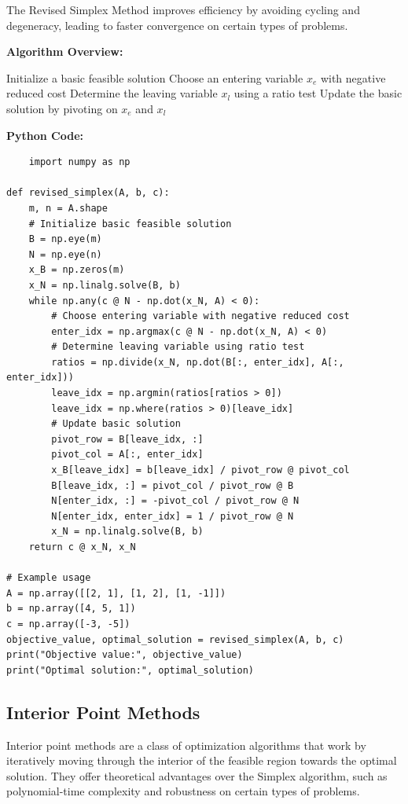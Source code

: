 \documentclass[12pt]{book} %
\begin{document}
The Revised Simplex Method improves efficiency by avoiding cycling and degeneracy, leading to faster convergence on certain types of problems.

\textbf{Algorithm Overview:}
\FloatBarrier
\begin{algorithm}[H]
\caption{Revised Simplex Method}
\begin{algorithmic}[1]
\State Initialize a basic feasible solution
\State Choose an entering variable \(x_e\) with negative reduced cost
\State Determine the leaving variable \(x_l\) using a ratio test
\State Update the basic solution by pivoting on \(x_e\) and \(x_l\)
\EndWhile
\end{algorithmic}
\end{algorithm}
\FloatBarrier
\textbf{Python Code:}
\FloatBarrier
\begin{lstlisting}
    import numpy as np

def revised_simplex(A, b, c):
    m, n = A.shape
    # Initialize basic feasible solution
    B = np.eye(m)
    N = np.eye(n)
    x_B = np.zeros(m)
    x_N = np.linalg.solve(B, b)
    while np.any(c @ N - np.dot(x_N, A) < 0):
        # Choose entering variable with negative reduced cost
        enter_idx = np.argmax(c @ N - np.dot(x_N, A) < 0)
        # Determine leaving variable using ratio test
        ratios = np.divide(x_N, np.dot(B[:, enter_idx], A[:, enter_idx]))
        leave_idx = np.argmin(ratios[ratios > 0])
        leave_idx = np.where(ratios > 0)[leave_idx]
        # Update basic solution
        pivot_row = B[leave_idx, :]
        pivot_col = A[:, enter_idx]
        x_B[leave_idx] = b[leave_idx] / pivot_row @ pivot_col
        B[leave_idx, :] = pivot_col / pivot_row @ B
        N[enter_idx, :] = -pivot_col / pivot_row @ N
        N[enter_idx, enter_idx] = 1 / pivot_row @ N
        x_N = np.linalg.solve(B, b)
    return c @ x_N, x_N

# Example usage
A = np.array([[2, 1], [1, 2], [1, -1]])
b = np.array([4, 5, 1])
c = np.array([-3, -5])
objective_value, optimal_solution = revised_simplex(A, b, c)
print("Objective value:", objective_value)
print("Optimal solution:", optimal_solution)
\end{lstlisting}


\subsection{Interior Point Methods}
Interior point methods are a class of optimization algorithms that work by iteratively moving through the interior of the feasible region towards the optimal solution. They offer theoretical advantages over the Simplex algorithm, such as polynomial-time complexity and robustness on certain types of problems.
\end{document}
